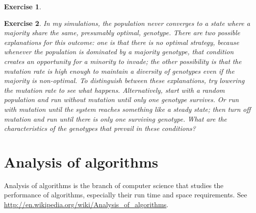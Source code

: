 \documentclass[12pt]{book}
\theoremstyle{exercise}
\newtheorem{exercise}{Exercise}[chapter]
\newcommand{\py}{\verb}%}
\begin{document}
\begin{exercise}

\end{exercise}

\begin{exercise}

In my simulations, the population never converges to a state where a majority share the same, presumably optimal, genotype. There are two possible explanations for this outcome: one is that there is no optimal strategy, because whenever the population is dominated by a majority genotype, that condition creates an opportunity for a minority to invade; the other possibility is that the mutation rate is high enough to maintain a diversity of genotypes even if the majority is non-optimal. To distinguish between these explanations, try lowering the mutation rate to see what happens. Alternatively, start with a random population and run without mutation until only one genotype survives. Or run with mutation until the system reaches something like a steady state; then turn off mutation and run until there is only one surviving genotype. What are the characteristics of the genotypes that prevail in these conditions?

\end{exercise}



\appendix

\chapter{Analysis of algorithms}
\label{algorithms}

Analysis of algorithms is the branch of computer science that studies
the performance of algorithms, especially their run time and space
requirements.  See \url{http://en.wikipedia.org/wiki/Analysis_of_algorithms}.
\end{document}
